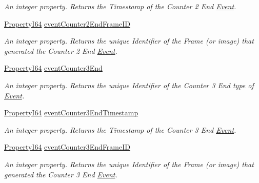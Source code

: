 \begin{DoxyCompactItemize}
\begin{DoxyCompactList}\small\item\em An integer property. Returns the Timestamp of the Counter 2 End \hyperlink{classmv_i_m_p_a_c_t_1_1acquire_1_1_event}{Event}. \end{DoxyCompactList}\item 
\hyperlink{group___common_interface_ga81749b2696755513663492664a18a893}{Property\+I64} \hyperlink{classmv_i_m_p_a_c_t_1_1acquire_1_1_gen_i_cam_1_1_event_control_a5399b768b8af00221a55390e143345d6}{event\+Counter2\+End\+Frame\+I\+D}
\begin{DoxyCompactList}\small\item\em An integer property. Returns the unique Identifier of the Frame (or image) that generated the Counter 2 End \hyperlink{classmv_i_m_p_a_c_t_1_1acquire_1_1_event}{Event}. \end{DoxyCompactList}\item 
\hyperlink{group___common_interface_ga81749b2696755513663492664a18a893}{Property\+I64} \hyperlink{classmv_i_m_p_a_c_t_1_1acquire_1_1_gen_i_cam_1_1_event_control_aeabdf10aee695943d0e55c09e7ff4fc7}{event\+Counter3\+End}
\begin{DoxyCompactList}\small\item\em An integer property. Returns the unique Identifier of the Counter 3 End type of \hyperlink{classmv_i_m_p_a_c_t_1_1acquire_1_1_event}{Event}. \end{DoxyCompactList}\item 
\hyperlink{group___common_interface_ga81749b2696755513663492664a18a893}{Property\+I64} \hyperlink{classmv_i_m_p_a_c_t_1_1acquire_1_1_gen_i_cam_1_1_event_control_a1d62595185ff404bac88cc8902a8fb80}{event\+Counter3\+End\+Timestamp}
\begin{DoxyCompactList}\small\item\em An integer property. Returns the Timestamp of the Counter 3 End \hyperlink{classmv_i_m_p_a_c_t_1_1acquire_1_1_event}{Event}. \end{DoxyCompactList}\item 
\hyperlink{group___common_interface_ga81749b2696755513663492664a18a893}{Property\+I64} \hyperlink{classmv_i_m_p_a_c_t_1_1acquire_1_1_gen_i_cam_1_1_event_control_a9ecc85227bdbe020c65ba21a96aee337}{event\+Counter3\+End\+Frame\+I\+D}
\begin{DoxyCompactList}\small\item\em An integer property. Returns the unique Identifier of the Frame (or image) that generated the Counter 3 End \hyperlink{classmv_i_m_p_a_c_t_1_1acquire_1_1_event}{Event}. \end{DoxyCompactList}\item 

\end{DoxyCompactItemize}
